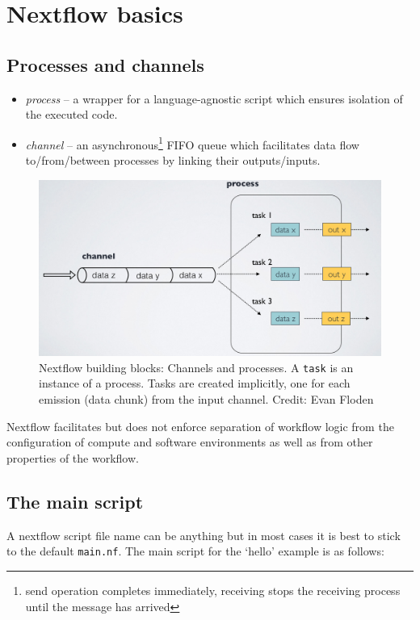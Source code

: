 \section{Nextflow basics}

\subsection{Processes and channels}


\begin{itemize}
\item \emph{process} -- a wrapper for a language-agnostic script which ensures isolation of the executed code.
\item \emph{channel} -- an asynchronous\footnote{send operation completes immediately, receiving stops the receiving process until the message has arrived} FIFO queue which facilitates data flow to/from/between processes by linking their outputs/inputs.
\end{itemize}


\begin{figure}[H]
\centering
\includegraphics[width=.8\textwidth]{handout/channel-process.png}
\caption{Nextflow building blocks: Channels and processes. A \texttt{task} is an instance of a process. Tasks are created implicitly, one for each emission (data chunk) from the input channel. Credit: Evan Floden}
\label{fig:proc-chn}
\end{figure}

Nextflow facilitates but does not enforce separation of workflow logic from the configuration
of compute and software environments as well as from other properties of the workflow.


\subsection{The main script}

A nextflow script file name can be anything but in most cases it is best to stick to the default \texttt{main.nf}. 
The main script for the `hello' example is as follows:


